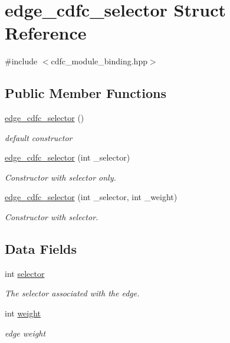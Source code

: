 \hypertarget{structedge__cdfc__selector}{}\section{edge\+\_\+cdfc\+\_\+selector Struct Reference}
\label{structedge__cdfc__selector}


{\ttfamily \#include $<$cdfc\+\_\+module\+\_\+binding.\+hpp$>$}

\subsection*{Public Member Functions}
\begin{DoxyCompactItemize}
\item 
\hyperlink{structedge__cdfc__selector_ae6c724d94d807c036667e1f5c3e11bfc}{edge\+\_\+cdfc\+\_\+selector} ()
\begin{DoxyCompactList}\small\item\em default constructor \end{DoxyCompactList}\item 
\hyperlink{structedge__cdfc__selector_ada77eb69038f88f49a21418693dcf4b2}{edge\+\_\+cdfc\+\_\+selector} (int \+\_\+selector)
\begin{DoxyCompactList}\small\item\em Constructor with selector only. \end{DoxyCompactList}\item 
\hyperlink{structedge__cdfc__selector_a106aea02dc81643ab757966c2b6b8f69}{edge\+\_\+cdfc\+\_\+selector} (int \+\_\+selector, int \+\_\+weight)
\begin{DoxyCompactList}\small\item\em Constructor with selector. \end{DoxyCompactList}\end{DoxyCompactItemize}
\subsection*{Data Fields}
\begin{DoxyCompactItemize}
\item 
int \hyperlink{structedge__cdfc__selector_aa8dd2e707440b475d207bd5e52b74274}{selector}
\begin{DoxyCompactList}\small\item\em The selector associated with the edge. \end{DoxyCompactList}\item 
int \hyperlink{structedge__cdfc__selector_af9c1537182fc07ee4af56dc3b38b6565}{weight}
\begin{DoxyCompactList}\small\item\em edge weight \end{DoxyCompactList}\end{DoxyCompactItemize}


